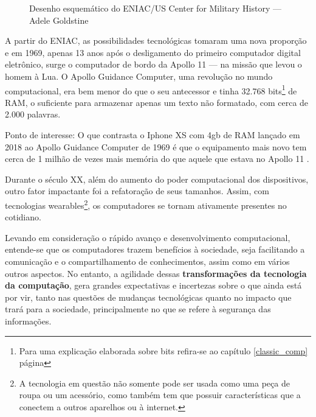 \vspace{1cm}
\begin{figure}[H] \centering 
  \caption{\label{ENIAC_floor_layout} Desenho esquemático do ENIAC/US Center for Military History — Adele Goldstine} 
\end{figure}

A partir do ENIAC, as possibilidades tecnológicas tomaram uma nova proporção e em 1969, apenas 13 anos após o desligamento do primeiro computador digital eletrônico, surge o computador de bordo da Apollo 11 — na missão que levou o homem à Lua. O Apollo Guidance Computer, uma revolução no mundo computacional, era bem menor do que o seu antecessor e tinha 32.768 bits\footnote{Para uma explicação elaborada sobre bits refira-se ao capítulo \ref{classic_comp} página \pageref{bits}} de RAM, o suficiente para armazenar apenas um texto não formatado, com cerca de 2.000 palavras.

Ponto de interesse: O que contrasta o Iphone XS com 4gb de RAM lançado em 2018 ao Apollo Guidance Computer de 1969 é que o equipamento mais novo tem cerca de 1 milhão de vezes  mais memória do que aquele que estava no Apollo 11 \cite{5}.

Durante o século XX, além do aumento do poder computacional dos dispositivos, outro fator impactante foi a refatoração de seus tamanhos. Assim, com tecnologias wearables\footnote{A tecnologia em questão não somente pode ser usada como uma peça de roupa ou um acessório, como também tem que possuir características que a conectem a outros aparelhos ou à internet.}, os computadores se tornam ativamente presentes no cotidiano. 

Levando em consideração o rápido avanço e desenvolvimento computacional, entende-se que os computadores trazem benefícios à sociedade, seja facilitando a comunicação e o compartilhamento de conhecimentos, assim como em vários outros aspectos. No entanto, a agilidade dessas \textbf{transformações da tecnologia da computação}, gera grandes expectativas e incertezas sobre o que ainda está por vir, tanto nas questões de mudanças tecnológicas quanto no impacto que trará para a sociedade, principalmente no que se refere à segurança das informações. 

